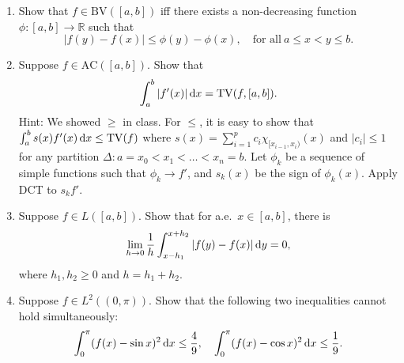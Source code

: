 \documentclass{article}
\begin{document}
\begin{enumerate}



\item Show that $f \in \mathrm{BV}([a,b])$ iff there exists a non-decreasing function $\phi: [a,b] \to \mathbb{R}$ such that
\[
|f(y) - f(x) | \le \phi(y) - \phi(x), \quad \mbox{for all}\ a \le x < y \le b.
\]





\item Suppose $f \in \mathrm{AC}([a,b])$. Show that
\[
\int_{a}^{b} |f'(x)| \dif x = \mathrm{TV}(f, [a,b]).
\]
Hint: We showed $\ge$ in class. For $\le$, it is easy to show that $\int_{a}^{b} s(x) f'(x) \dif x \le \mathrm{TV}(f)$ where $s(x) = \sum_{i=1}^{p}c_{i}\chi_{[x_{i-1},x_{i})}(x)$ and $|c_{i}| \le 1$ for any partition $\Delta: a=x_{0} < x_{1} < \dots < x_{n} =b$. Let $\phi_{k}$ be a sequence of simple functions such that $\phi_{k} \to f'$, and $s_{k}(x)$ be the sign of $\phi_{k}(x)$. Apply DCT to $s_{k} f'$.





\item Suppose $f \in L([a,b])$. Show that for a.e.~$x \in [a,b]$, there is
\[
\lim_{h \to 0} \frac{1}{h} \int_{x - h_{1}}^{x + h_{2}} |f(y) - f(x) | \dif y  = 0,
\]
where $h_{1},h_{2} \ge 0$ and $h = h_{1}+h_{2}$.







\item Suppose $f \in L^{2}((0,\pi))$. Show that the following two inequalities cannot hold simultaneously:
\[
\int_{0}^{\pi}(f(x) - \sin x)^{2} \dif x \le \frac{4}{9}, \quad 
\int_{0}^{\pi}(f(x) - \cos x)^{2} \dif x \le \frac{1}{9}.
\]


\end{enumerate}
\end{document}
